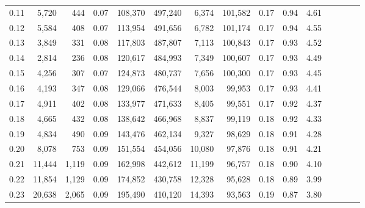 \begin{tabular}{rrrcrrrrrrrrrrr}
0.11 &   5,720 &    444 &                                       0.07 &  108,370 &  497,240 &    6,374 &  101,582 &  0.17 &  0.94 &                         4.61 \\
0.12 &   5,584 &    408 &                                       0.07 &  113,954 &  491,656 &    6,782 &  101,174 &  0.17 &  0.94 &                         4.55 \\
0.13 &   3,849 &    331 &                                       0.08 &  117,803 &  487,807 &    7,113 &  100,843 &  0.17 &  0.93 &                         4.52 \\
0.14 &   2,814 &    236 &                                       0.08 &  120,617 &  484,993 &    7,349 &  100,607 &  0.17 &  0.93 &                         4.49 \\
0.15 &   4,256 &    307 &                                       0.07 &  124,873 &  480,737 &    7,656 &  100,300 &  0.17 &  0.93 &                         4.45 \\
0.16 &   4,193 &    347 &                                       0.08 &  129,066 &  476,544 &    8,003 &   99,953 &  0.17 &  0.93 &                         4.41 \\
0.17 &   4,911 &    402 &                                       0.08 &  133,977 &  471,633 &    8,405 &   99,551 &  0.17 &  0.92 &                         4.37 \\
0.18 &   4,665 &    432 &                                       0.08 &  138,642 &  466,968 &    8,837 &   99,119 &  0.18 &  0.92 &                         4.33 \\
0.19 &   4,834 &    490 &                                       0.09 &  143,476 &  462,134 &    9,327 &   98,629 &  0.18 &  0.91 &                         4.28 \\
0.20 &   8,078 &    753 &                                       0.09 &  151,554 &  454,056 &   10,080 &   97,876 &  0.18 &  0.91 &                         4.21 \\
0.21 &  11,444 &  1,119 &                                       0.09 &  162,998 &  442,612 &   11,199 &   96,757 &  0.18 &  0.90 &                         4.10 \\
0.22 &  11,854 &  1,129 &                                       0.09 &  174,852 &  430,758 &   12,328 &   95,628 &  0.18 &  0.89 &                         3.99 \\
0.23 &  20,638 &  2,065 &                                       0.09 &  195,490 &  410,120 &   14,393 &   93,563 &  0.19 &  0.87 &                         3.80 \\

\end{tabular}
